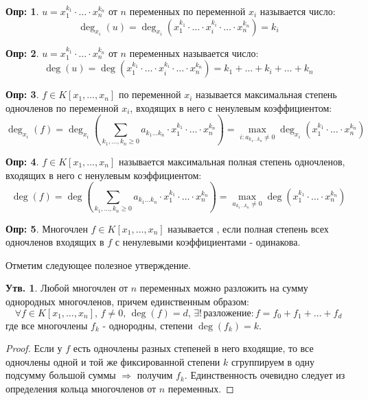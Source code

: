 \documentclass[12pt]{article}
\theoremstyle{definition}
\newtheorem{defn}{Опр:}
\newtheorem{prop}{Утв.}
\newcommand{\ddsum}[2]{\displaystyle\sum\limits_{#1}^{#2}}
\begin{document}
\begin{defn}
	 $u = x_1^{k_1}{\cdot}\dotsc{\cdot}x_n^{k_n}$ от $n$ переменных по переменной $x_i$ называется число:
	$$
		\deg_{x_i}(u) = \deg_{x_i}\left(x_1^{k_1}{\cdot}\dotsc{\cdot}x_i^{k_i}{\cdot}\dotsc{\cdot}x_n^{k_n}\right) = k_i
	$$
\end{defn}
\begin{defn}
	 $u = x_1^{k_1}{\cdot}\dotsc{\cdot}x_n^{k_n}$ от $n$ переменных называется число:
	$$
		\deg(u) = \deg\left(x_1^{k_1}{\cdot}\dotsc{\cdot}x_i^{k_i}{\cdot}\dotsc{\cdot}x_n^{k_n}\right) = k_1 + \dotsc + k_i + \dotsc + k_n
	$$
\end{defn}
\begin{defn}
	 $f \in K[x_1,\dotsc,x_n]$ по переменной $x_i$ называется максимальная степень одночленов по переменной $x_i$, входящих в него с ненулевым коэффициентом:
	$$
		\deg_{x_i}(f) = \deg_{x_i}\left(\ddsum{k_1,\dotsc,k_n \geq 0}{}a_{k_1\dotsc k_n}{\cdot}x_1^{k_1}{\cdot}\dotsc{\cdot}x_n^{k_n}\right) = \max\limits_{i \colon a_{k_1\dotsc k_n} \neq 0 }\deg_{x_i}(x_1^{k_1}{\cdot}\dotsc{\cdot}x_n^{k_n})
	$$
\end{defn}

\begin{defn}
	 $f \in K[x_1,\dotsc,x_n]$ называется максимальная полная степень одночленов, входящих в него с ненулевым коэффициентом:
	$$
		\deg(f) = \deg\left(\ddsum{k_1,\dotsc,k_n \geq 0}{}a_{k_1\dotsc k_n}{\cdot}x_1^{k_1}{\cdot}\dotsc{\cdot}x_n^{k_n}\right) = \max\limits_{ a_{k_1\dotsc k_n} \neq 0 }\deg(x_1^{k_1}{\cdot}\dotsc{\cdot}x_n^{k_n})
	$$
\end{defn}
\begin{defn}
	Многочлен $f \in K[x_1,\dotsc,x_n]$ называется , если полная степень всех одночленов входящих в $f$ с ненулевыми коэффициентами - одинакова.
\end{defn}
Отметим следующее полезное утверждение.
\begin{prop}
	Любой многочлен от $n$ переменных можно разложить на сумму однородных многочленов, причем единственным образом: 
	$$
		\forall f \in K[x_1,\dotsc, x_n], \, f \neq 0, \, \deg(f) = d,\, \exists! \, \text{разложение} \colon f = f_0 + f_1 + \dotsc + f_d
	$$ 
	где все многочлены $f_k$ - однородны, степени $\deg(f_k) = k$.
\end{prop}
\begin{proof}
	Если у $f$ есть одночлены разных степеней в него входящие, то все одночлены одной и той же фиксированной степени $k$ сгруппируем в одну подсумму большой суммы $\Rightarrow$ получим $f_k$. Единственность очевидно следует из определения кольца многочленов от $n$ переменных.
\end{proof}
\end{document}

